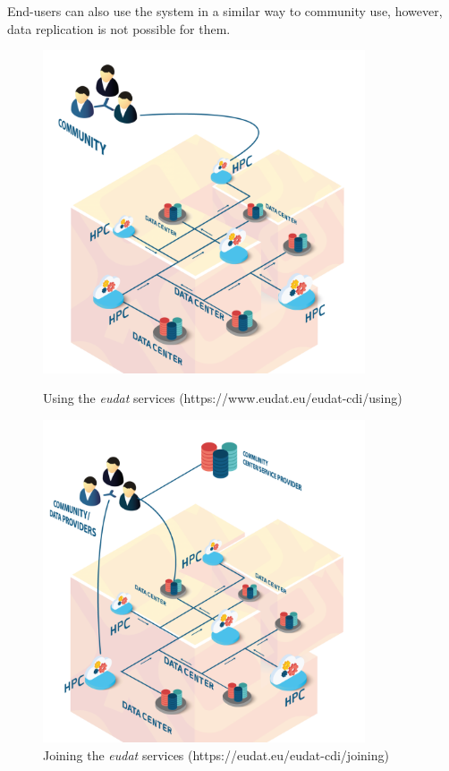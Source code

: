 End-users can also use the system in a similar way to community use, however, data replication is not possible for them.
  
\begin{figure}[!htb]
   \begin{minipage}{0.48\textwidth}
     \centering
     \includegraphics[width=0.85\textwidth]{img/state_of_the_art/use_eudat.png}
     \caption{Using the \textit{\gls{eudat}} services (https://www.eudat.eu/eudat-cdi/using)}\label{Fig:Data1}
   \end{minipage}\hfill
   \begin{minipage}{0.48\textwidth}
     \centering
     \includegraphics[width=0.85\textwidth]{img/state_of_the_art/join_eudat.png}
     \caption{Joining the \textit{\gls{eudat}} services (https://eudat.eu/eudat-cdi/joining)}\label{Fig:Data2}
   \end{minipage}
\end{figure}
  
